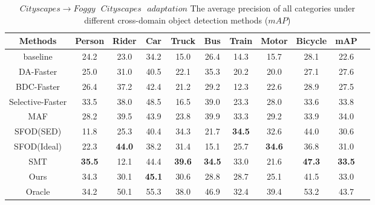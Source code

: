 \documentclass[sn-mathphys]{sn-jnl}%
\theoremstyle{thmstyleone}%
\theoremstyle{thmstyletwo}%
\theoremstyle{thmstylethree}%
\begin{document}
		
\begin{table}[]
	\begin{center}{	
			\caption{$Cityscapes\to Foggy\text{ }Cityscapes\text{ }adaptation$ The average precision of all categories under different cross-domain object detection methods ($mAP$)}		\label{table:1}
			\setlength{\tabcolsep}{4pt}		%
			\begin{tabular}{ccccccccccc}
				
				\hline
				Methods	 &Person	&Rider	&Car	&Truck	&Bus	&Train	&Motor	&Bicycle	&mAP        \\ \hline
				
				baseline   &24.2	&23.0	&34.2	&15.0	&26.4	&14.3	&15.7	&28.1	&22.6    \\ \hline
				
				DA-Faster\cite{chen2018domain}  &25.0	&31.0	&40.5	&22.1	&35.3	&20.2	&20.0	&27.1	&27.6 \\
				
				BDC-Faster\cite{saito2019strong}    &26.4 	&37.2	&42.4	&21.2	&29.2	&12.3	&22.6	&28.9	&27.5   \\
				
				Selective-Faster\cite{zhu2019adapting}  &33.5	&38.0	&48.5	&16.5	&39.0	&23.3	&28.0	&33.6	&33.8 \\ 
				
				MAF\cite{he2019multi} 	&28.2	&39.5	&43.9	&23.8	&39.9	&33.3	&29.2	&33.9	&34.0  \\ \hline
				
				SFOD(SED)\cite{li2020free}	&11.8	&25.3	&40.4	&34.3	&21.7	&\textbf{34.5}	&32.6	&44.0	&30.6  \\
				
				SFOD(Ideal)\cite{li2020free} 	&22.3	&\textbf{44.0}	&38.2	&31.4	&15.1	&25.7	&\textbf{34.6}	&36.8	&31.0 \\
				
				SMT\cite{zhang2021source} 	&\textbf{35.5}	&12.1	&44.4	&\textbf{39.6}	&\textbf{34.5}	&33.0	&21.6	&\textbf{47.3}	&\textbf{33.5}  \\
				
				Ours	&34.3	&30.1	&\textbf{45.1}	&30.6	&28.8	&28.7	&25.1	&41.5	&33.0   \\ \hline
				
				Oracle     &34.2	&50.1	&55.3	&38.0	&46.9	&32.4	&39.4	&53.2	&43.7      \\ \hline
				
		\end{tabular}}	
	\end{center}
\end{table}
\end{document}
